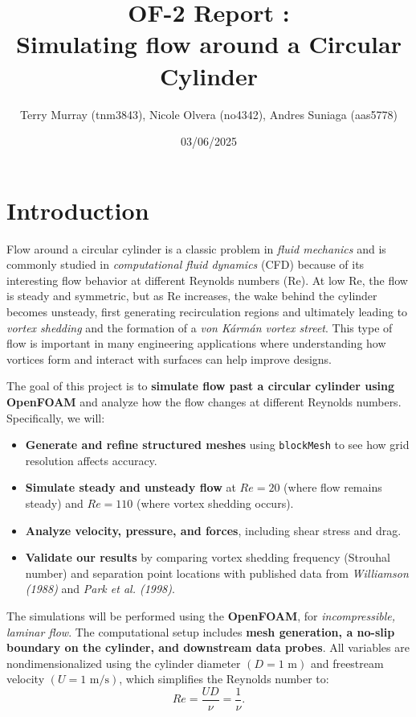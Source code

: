 \documentclass[11pt]{article}
\title{\bf OF-2 Report : \\[2mm] Simulating flow around a Circular Cylinder}
\author{Terry Murray (tnm3843), Nicole Olvera (no4342), Andres Suniaga (aas5778)}
\date{03/06/2025}
\begin{document}
\maketitle

\noindent\makebox[\textwidth]{\rule{\textwidth}{0.2pt}}
\tableofcontents
\noindent\makebox[\textwidth]{\rule{\textwidth}{0.2pt}}
\pagebreak

\section{Introduction}
Flow around a circular cylinder is a classic problem in \textit{fluid mechanics} and is commonly studied in \textit{computational fluid dynamics} (CFD) because of its interesting flow behavior at different Reynolds numbers (Re). At low Re, the flow is steady and symmetric, but as Re increases, the wake behind the cylinder becomes unsteady, first generating recirculation regions and ultimately leading to \textit{vortex shedding} and the formation of a \textit{von K\'arm\'an vortex street}. This type of flow is important in many engineering applications where understanding how vortices form and interact with surfaces can help improve designs.
\vspace{2.5mm}

The goal of this project is to \textbf{simulate flow past a circular cylinder using OpenFOAM} and analyze how the flow changes at different Reynolds numbers. Specifically, we will:
\begin{itemize}
    \item \textbf{Generate and refine structured meshes} using \texttt{blockMesh} to see how grid resolution affects accuracy.
    \item \textbf{Simulate steady and unsteady flow} at \(Re = 20\) (where flow remains steady) and \(Re = 110\) (where vortex shedding occurs).
    \item \textbf{Analyze velocity, pressure, and forces}, including shear stress and drag.
    \item \textbf{Validate our results} by comparing vortex shedding frequency (Strouhal number) and separation point locations with published data from \textit{Williamson (1988)} and \textit{Park et al. (1998)}.
\end{itemize}

The simulations will be performed using the \textbf{OpenFOAM}, for \textit{incompressible, laminar flow}. The computational setup includes \textbf{mesh generation, a no-slip boundary on the cylinder, and downstream data probes}. All variables are nondimensionalized using the cylinder diameter \((D = 1 \text{ m})\) and freestream velocity \((U = 1 \text{ m/s})\), which simplifies the Reynolds number to:
\begin{equation}
    Re = \frac{U D}{\nu} = \frac{1}{\nu}.
\end{equation}
\end{document}
